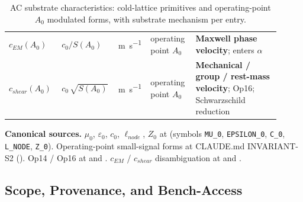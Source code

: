 \begin{table}[htbp]
\begin{tabular}{p{0.18\linewidth} p{0.20\linewidth} p{0.07\linewidth} p{0.16\linewidth} p{0.30\linewidth}}
$c_{EM}(A_0)$ & $c_0 / S(A_0)$ & \si{\metre\per\second} & operating point $A_0$ & \textbf{Maxwell phase velocity}; enters $\alpha$ \\
$c_{shear}(A_0)$ & $c_0\, \sqrt{S(A_0)}$ & \si{\metre\per\second} & operating point $A_0$ & \textbf{Mechanical / group / rest-mass velocity}; Op16; Schwarzschild reduction \\
\bottomrule
\end{tabular}
\caption{AC substrate characteristics: cold-lattice primitives and operating-point $A_0$ modulated forms, with substrate mechanism per entry.}
\label{tab:vol9_ac_spec}
\end{table}

\noindent
\textbf{Canonical sources.} $\mu_0$, $\varepsilon_0$, $c_0$, $\ell_{node}$, $Z_0$ at  (symbols \texttt{MU\_0}, \texttt{EPSILON\_0}, \texttt{C\_0}, \texttt{L\_NODE}, \texttt{Z\_0}). Operating-point small-signal forms at CLAUDE.md INVARIANT-S2 (). Op14 / Op16 at  and . $c_{EM}$ / $c_{shear}$ disambiguation at  and .

\subsection{Scope, Provenance, and Bench-Access}
\label{subsec:vol9_ac_scope_provenance}

